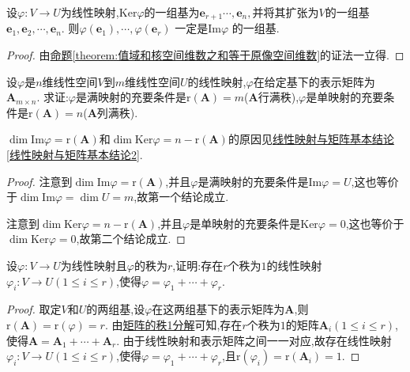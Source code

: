 \documentclass[../../main.tex]{subfiles}
\begin{document}
\begin{corollary}\label{corollary:由核的基导出值域的基}
设\(\varphi:V\to U\)为线性映射,$\mathrm{Ker}\varphi $的一组基为$\boldsymbol{e}_{r+1}\cdots ,\boldsymbol{e}_n,$并将其扩张为$V$的一组基$\boldsymbol{e}_1,\boldsymbol{e}_2,\cdots ,\boldsymbol{e}_n.$
则$\varphi \left( \boldsymbol{e}_1 \right) ,\cdots ,\varphi \left( \boldsymbol{e}_r \right)$ 一定是Im$\varphi$ 的一组基.
\end{corollary}
\begin{proof}
由\hyperref[theorem:值域和核空间维数之和等于原像空间维数]{命题\ref{theorem:值域和核空间维数之和等于原像空间维数}}的证法一立得.

\end{proof}
\begin{proposition}\label{proposition:行/列满秩矩阵对应满/单射}
设\(\varphi\)是\(n\)维线性空间\(V\)到\(m\)维线性空间\(U\)的线性映射,\(\varphi\)在给定基下的表示矩阵为\(\boldsymbol{A}_{m\times n}\). 求证:\(\varphi\)是满映射的充要条件是\(\text{r}(\boldsymbol{A}) = m\)($\boldsymbol{A}$行满秩),\(\varphi\)是单映射的充要条件是\(\text{r}(\boldsymbol{A}) = n\)($\boldsymbol{A}$列满秩).
\end{proposition}
\begin{note}
\(\dim\text{Im}\varphi=\text{r}(\boldsymbol{A})\)和\(\dim\text{Ker}\varphi=n - \text{r}(\boldsymbol{A})\)的原因见\hyperref[线性映射与矩阵基本结论2]{线性映射与矩阵基本结论\ref{线性映射与矩阵基本结论2}}.
\end{note}
\begin{proof}
注意到\(\dim\text{Im}\varphi=\text{r}(\boldsymbol{A})\),并且\(\varphi\)是满映射的充要条件是\(\text{Im}\varphi = U\),这也等价于\(\dim\text{Im}\varphi=\dim U = m\),故第一个结论成立.

注意到\(\dim\text{Ker}\varphi=n - \text{r}(\boldsymbol{A})\),并且\(\varphi\)是单映射的充要条件是\(\text{Ker}\varphi = 0\),这也等价于\(\dim\text{Ker}\varphi = 0\),故第二个结论成立.
\end{proof}

\begin{proposition}\label{proposition:线性映射的秩1分解}
设\(\varphi:V\to U\)为线性映射且\(\varphi\)的秩为\(r\),证明:存在\(r\)个秩为\(1\)的线性映射\(\varphi_i:V\to U(1\leqslant  i\leqslant  r)\),使得\(\varphi=\varphi_1+\cdots+\varphi_r\).
\end{proposition}
\begin{proof}
取定\(V\)和\(U\)的两组基,设\(\varphi\)在这两组基下的表示矩阵为\(\boldsymbol{A}\),则\(\text{r}(\boldsymbol{A})=\text{r}(\varphi)=r\). 由\hyperref[proposition:矩阵的秩1分解]{矩阵的秩1分解}可知,存在\(r\)个秩为\(1\)的矩阵\(\boldsymbol{A}_i(1\leqslant  i\leqslant  r)\),使得\(\boldsymbol{A}=\boldsymbol{A}_1+\cdots+\boldsymbol{A}_r\). 由于线性映射和表示矩阵之间一一对应,故存在线性映射\(\varphi_i:V\to U(1\leqslant  i\leqslant  r)\),使得\(\varphi=\varphi_1+\cdots+\varphi_r\),且\(\text{r}(\varphi_i)=\text{r}(\boldsymbol{A}_i)=1\).
\end{proof}
\end{document}

